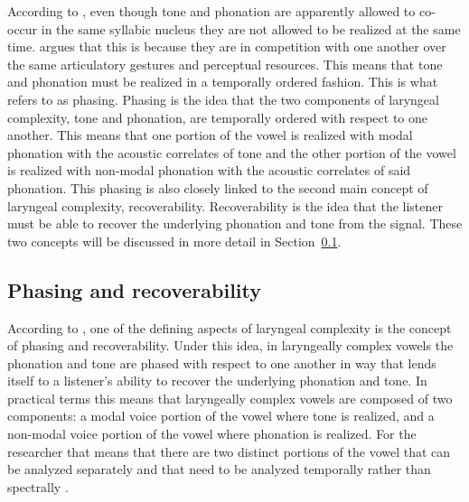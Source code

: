 According to \citet{silvermanLaryngealComplexityOtomanguean1997,silvermanPhasingRecoverability1997}, even though tone and phonation are apparently allowed to co-occur in the same syllabic nucleus they are not allowed to be realized at the same time. \citeauthor{silvermanLaryngealComplexityOtomanguean1997} argues that this is because they are in competition with one another over the same articulatory gestures and perceptual resources. This means that tone and phonation must be realized in a temporally ordered fashion. This is what \citeauthor{silvermanLaryngealComplexityOtomanguean1997} refers to as phasing. Phasing is the idea that the two components of laryngeal complexity, tone and phonation, are temporally ordered with respect to one another. This means that one portion of the vowel is realized with modal phonation with the acoustic correlates of tone and the other portion of the vowel is realized with non-modal phonation with the acoustic correlates of said phonation. This phasing is also closely linked to the second main concept of laryngeal complexity, recoverability. Recoverability is the idea that the listener must be able to recover the underlying phonation and tone from the signal. These two concepts will be discussed in more detail in Section~\ref{sec:phasing_and_recoverability}.

\subsection{Phasing and recoverability}\label{sec:phasing_and_recoverability}

According to \citet{silvermanLaryngealComplexityOtomanguean1997,silvermanPhasingRecoverability1997}, one of the defining aspects of laryngeal complexity is the concept of phasing and recoverability. Under this idea, in laryngeally complex vowels the phonation and tone are phased with respect to one another in way that lends itself to a listener's ability to recover the underlying phonation and tone. In practical terms this means that laryngeally complex vowels are composed of two components: a modal voice portion of the vowel where tone is realized, and a non-modal voice portion of the vowel where phonation is realized. For the researcher that means that there are two distinct portions of the vowel that can be analyzed separately and that need to be analyzed temporally rather than spectrally \citep[237]{silvermanLaryngealComplexityOtomanguean1997}.

